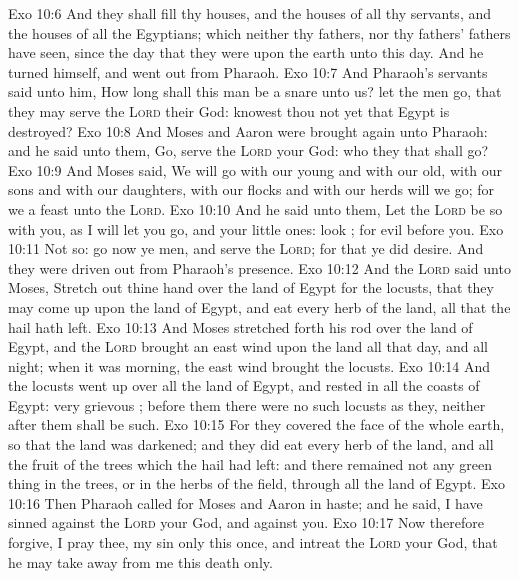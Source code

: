 \vs Exo 10:6 And they shall fill thy houses, and the houses of all thy servants, and the houses of all the Egyptians; which neither thy fathers, nor thy fathers' fathers have seen, since the day that they were upon the earth unto this day. And he turned himself, and went out from Pharaoh.
\vs Exo 10:7 And Pharaoh's servants said unto him, How long shall this man be a snare unto us? let the men go, that they may serve the \textsc{Lord} their God: knowest thou not yet that Egypt is destroyed?
\vs Exo 10:8 And Moses and Aaron were brought again unto Pharaoh: and he said unto them, Go, serve the \textsc{Lord} your God:  who  they that shall go?
\vs Exo 10:9 And Moses said, We will go with our young and with our old, with our sons and with our daughters, with our flocks and with our herds will we go; for we  a feast unto the \textsc{Lord}.
\vs Exo 10:10 And he said unto them, Let the \textsc{Lord} be so with you, as I will let you go, and your little ones: look ; for evil  before you.
\vs Exo 10:11 Not so: go now ye  men, and serve the \textsc{Lord}; for that ye did desire. And they were driven out from Pharaoh's presence.
\vs Exo 10:12 And the \textsc{Lord} said unto Moses, Stretch out thine hand over the land of Egypt for the locusts, that they may come up upon the land of Egypt, and eat every herb of the land,  all that the hail hath left.
\vs Exo 10:13 And Moses stretched forth his rod over the land of Egypt, and the \textsc{Lord} brought an east wind upon the land all that day, and all  night;  when it was morning, the east wind brought the locusts.
\vs Exo 10:14 And the locusts went up over all the land of Egypt, and rested in all the coasts of Egypt: very grievous ; before them there were no such locusts as they, neither after them shall be such.
\vs Exo 10:15 For they covered the face of the whole earth, so that the land was darkened; and they did eat every herb of the land, and all the fruit of the trees which the hail had left: and there remained not any green thing in the trees, or in the herbs of the field, through all the land of Egypt.
\vs Exo 10:16 Then Pharaoh called for Moses and Aaron in haste; and he said, I have sinned against the \textsc{Lord} your God, and against you.
\vs Exo 10:17 Now therefore forgive, I pray thee, my sin only this once, and intreat the \textsc{Lord} your God, that he may take away from me this death only.
